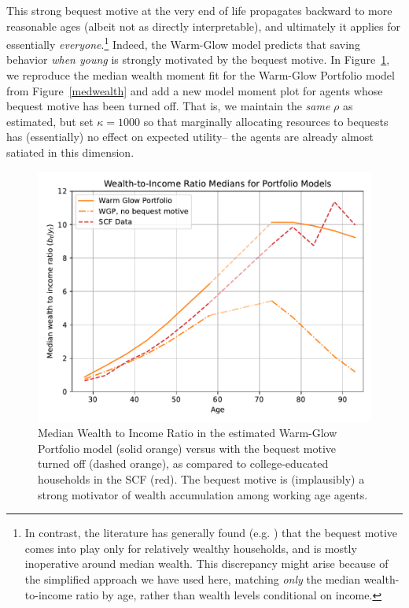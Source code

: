 \documentclass{article}
\newcommand{\CRRA}{\rho}
\begin{document}
This strong bequest motive at the very end of life propagates backward to more reasonable ages (albeit not as directly interpretable), and ultimately it applies for essentially \textit{everyone}.\footnote{In contrast, the literature has generally found (e.g. \cite{deNardiBequest}) that the bequest motive comes into play only for relatively wealthy households, and is mostly inoperative around median wealth.
This discrepancy might arise because of the simplified approach we have used here, matching \textit{only} the median wealth-to-income ratio by age, rather than wealth levels conditional on income.}
Indeed, the Warm-Glow model predicts that saving behavior \textit{when young} is strongly motivated by the bequest motive.
In Figure~\ref{nobequest}, we reproduce the median wealth moment fit for the Warm-Glow Portfolio model from Figure~\ref{medwealth} and add a new model moment plot for agents whose bequest motive has been turned off.
That is, we maintain the \textit{same} $\CRRA$ as estimated, but set $\kappa=1000$ so that marginally allocating resources to bequests has (essentially) no effect on expected utility-- the agents are already almost satiated in this dimension.

\begin{figure}[!htbp]
\centering
\includegraphics[width=0.7\linewidth]{files/StrongBequestMotive-2e332800a111f44825a86e123f53185a.pdf}
\caption[]{Median Wealth to Income Ratio in the estimated Warm-Glow Portfolio model (solid orange) versus with the bequest motive turned off (dashed orange), as compared to college-educated households in the SCF (red). The bequest motive is (implausibly) a strong motivator of wealth accumulation among working age agents.}
\label{nobequest}
\end{figure}
\end{document}

